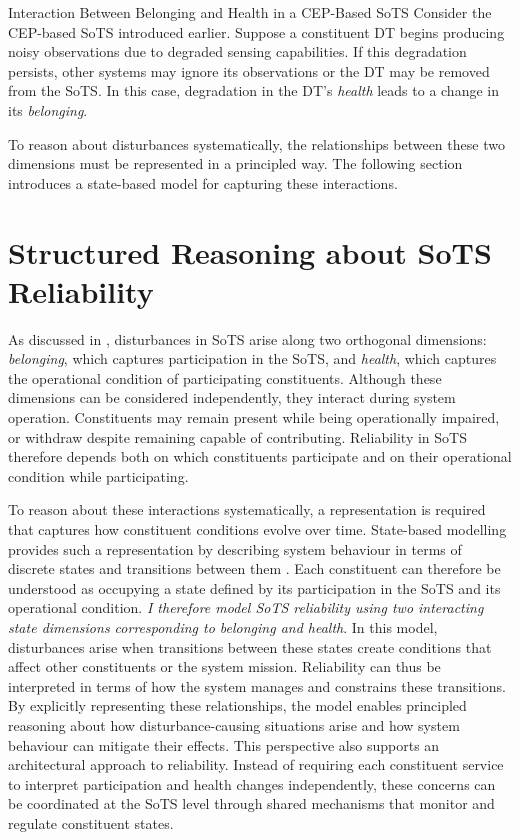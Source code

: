 \begin{runningexample}{Interaction Between Belonging and Health in a CEP-Based SoTS}
Consider the CEP-based SoTS introduced earlier. Suppose a constituent DT begins producing noisy observations due to degraded sensing capabilities. If this degradation persists, other systems may ignore its observations or the DT may be removed from the SoTS. In this case, degradation in the DT's \emph{health} leads to a change in its \emph{belonging}.

\end{runningexample}

To reason about disturbances systematically, the relationships between these two dimensions must be represented in a principled way. The following section introduces a state-based model for capturing these interactions.



\section{Structured Reasoning about SoTS Reliability}
\label{sec:structured-reasoning}

As discussed in , disturbances in SoTS arise along two orthogonal dimensions: \emph{belonging}, which captures participation in the SoTS, and \emph{health}, which captures the operational condition of participating constituents. Although these dimensions can be considered independently, they interact during system operation. Constituents may remain present while being operationally impaired, or withdraw despite remaining capable of contributing. Reliability in SoTS therefore depends both on which constituents participate and on their operational condition while participating.

To reason about these interactions systematically, a representation is required that captures how constituent conditions evolve over time. State-based modelling provides such a representation by describing system behaviour in terms of discrete states and transitions between them \cite{liang2006comparative}. Each constituent can therefore be understood as occupying a state defined by its participation in the SoTS and its operational condition. \emph{I therefore model SoTS reliability using two interacting state dimensions corresponding to belonging and health}. In this model, disturbances arise when transitions between these states create conditions that affect other constituents or the system mission. Reliability can thus be interpreted in terms of how the system manages and constrains these transitions. By explicitly representing these relationships, the model enables principled reasoning about how disturbance-causing situations arise and how system behaviour can mitigate their effects. This perspective also supports an architectural approach to reliability. Instead of requiring each constituent service to interpret participation and health changes independently, these concerns can be coordinated at the SoTS level through shared mechanisms that monitor and regulate constituent states.



